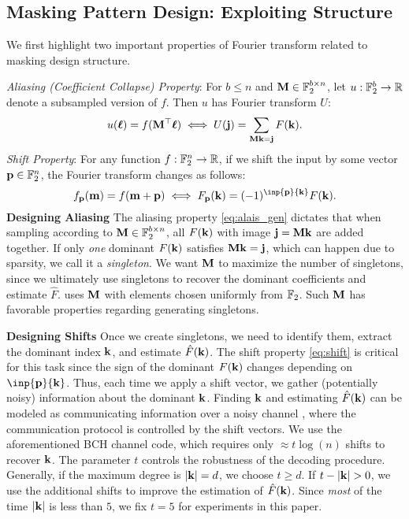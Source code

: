 \subsection{Masking Pattern Design: Exploiting Structure}
We first highlight two important properties of Fourier transform related to masking design structure.

\textit{Aliasing (Coefficient Collapse) Property}: For $b \leq n$ and $\mathbf M \in\mathbb F_2^{b \times n}$, let $u : \mathbb F_2^b \rightarrow \mathbb R$ denote a subsampled version of $f$. Then $u$ has Fourier transform $U$:
\begin{equation}\label{eq:alais_gen}
    u(\boldsymbol{\ell}) = f(\mathbf M^\top \boldsymbol{\ell}) \iff U(\mathbf j) = \sum_{\mathbf M \mathbf k = \mathbf j} F(\mathbf k).
\end{equation}
\textit{Shift Property}: For any function $f: \mathbb F_2^n \rightarrow \mathbb R$, if we shift the input by some vector $\mathbf p \in \mathbb F_2^n$, the Fourier transform changes as follows:
\begin{equation}\label{eq:shift}
    f_{\bp}(\bbm) = f(\bbm + \bp) \iff F_{\bp}(\bk) = (-1)^{\inp{\bp}{\bk}} F(\bk).
\end{equation}
\textbf{Designing Aliasing } The aliasing property \eqref{eq:alais_gen} dictates that when sampling according to $\mathbf M \in \mathbb F_2^{b \times n}$, all $F(\mathbf k)$ with image $\mathbf j = \mathbf M \mathbf k$ are added together.
%
If only \emph{one} dominant $F(\mathbf k)$ satisfies $\mathbf M \mathbf k = \mathbf j$, which can happen due to sparsity, we call it a \emph{singleton}.
%
We want $\mathbf M$ to maximize the number of singletons, since we ultimately use singletons to recover the dominant coefficients and estimate $\hat{F}$. 
% 
\SpecExp{} uses $\mathbf M$ with elements chosen uniformly from $\mathbb F_2$. Such $\mathbf M$ has favorable properties regarding generating singletons.

\textbf{Designing Shifts } Once we create singletons, we need to identify them, extract the dominant index $\mathbf k$, and estimate $\hat{F}(\mathbf k)$.
%
The shift property \eqref{eq:shift} is critical for this task since the sign of the dominant $F(\mathbf k)$ changes depending on $\inp{\bp}{\bk}$. Thus, each time we apply a shift vector, we gather (potentially noisy) information about the dominant $\mathbf k$. 
%
Finding $\mathbf k$ and estimating $\hat{F}(\mathbf k)$ can be modeled as communicating information over a noisy channel \cite{Shannon1948}, where the communication protocol is controlled by the shift vectors. We use the aforementioned BCH channel code, which requires only $\approx t \log(n)$ shifts to recover $\mathbf k$. The parameter $t$ controls the robustness of the decoding procedure. Generally, if the maximum degree is $\left\lvert \mathbf k \right\rvert = d$, we choose $t \geq d$. If $t - \left\lvert \mathbf k \right\rvert > 0$, we use the additional shifts to improve the estimation of $\hat{F}(\mathbf k)$. Since \emph{most} of the time $\left\lvert \mathbf k \right\rvert$ is less than $5$, we fix $t=5$ for experiments in this paper.   

